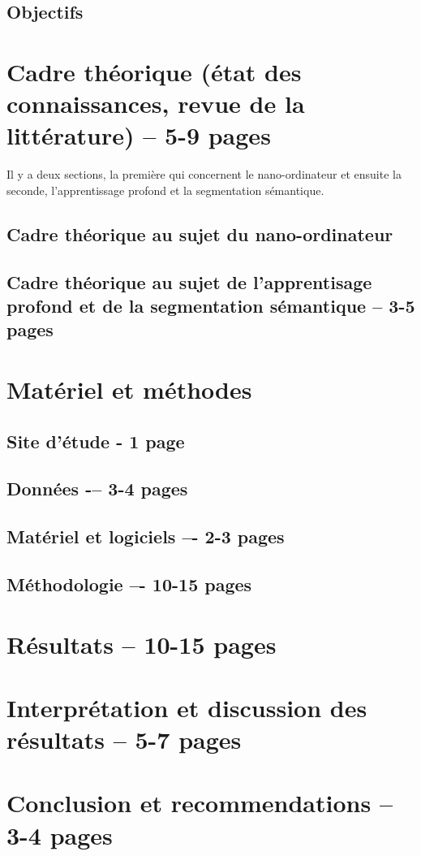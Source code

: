 \documentclass[12pt, letterpaper]{article}
\begin{document}
\subsection{Objectifs}


\section{Cadre théorique (état des connaissances, revue de la littérature) -- 5-9 pages}
Il y a deux sections, la première qui concernent le nano-ordinateur et ensuite la seconde, l'apprentissage profond et la segmentation sémantique.
\subsection{Cadre théorique au sujet du nano-ordinateur}

\subsection{Cadre théorique au sujet de l'apprentisage profond et de la segmentation sémantique -- 3-5 pages}


\section{Matériel et méthodes}
\subsection{Site d'étude - 1 page}

\subsection{Données -– 3-4 pages}

\subsection{Matériel et logiciels –- 2-3 pages}

\subsection{Méthodologie –- 10-15 pages}


\section{Résultats -- 10-15 pages}


\section{Interprétation et discussion des résultats -- 5-7 pages}


\section{Conclusion et recommendations -- 3-4 pages}


\clearpage 
\newpage
\printbibliography[title={\bibname\label{bib:references}}] 
\end{document}
